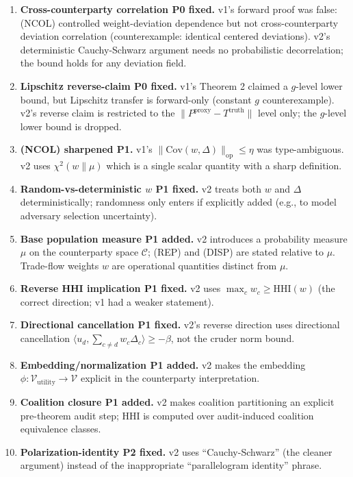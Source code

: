 \documentclass{article}
\newcommand{\HHI}{\mathrm{HHI}}
\newcommand{\Pproxy}{P^{\mathrm{proxy}}}
\newcommand{\Ttruth}{T^{\mathrm{truth}}}
\begin{document}
\begin{enumerate}
\item \textbf{Cross-counterparty correlation P0 fixed.}  v1's
  forward proof was false: (NCOL) controlled weight-deviation
  dependence but not cross-counterparty deviation correlation
  (counterexample: identical centered deviations).  v2's
  deterministic Cauchy-Schwarz argument needs no probabilistic
  decorrelation; the bound holds for any deviation field.

\item \textbf{Lipschitz reverse-claim P0 fixed.}  v1's Theorem 2
  claimed a $g$-level lower bound, but Lipschitz transfer is
  forward-only (constant $g$ counterexample).  v2's reverse claim
  is restricted to the $\|\Pproxy - \Ttruth\|$ level only; the
  $g$-level lower bound is dropped.

\item \textbf{(NCOL) sharpened P1.}  v1's $\|\mathrm{Cov}(w,
  \Delta)\|_{\mathrm{op}} \leq \eta$ was type-ambiguous.  v2 uses
  $\chi^2(w \| \mu)$ which is a single scalar quantity with a
  sharp definition.

\item \textbf{Random-vs-deterministic $w$ P1 fixed.}  v2 treats
  both $w$ and $\Delta$ deterministically; randomness only enters
  if explicitly added (e.g., to model adversary selection
  uncertainty).

\item \textbf{Base population measure P1 added.}  v2 introduces
  a probability measure $\mu$ on the counterparty space
  $\mathcal{C}$; (REP) and (DISP) are stated relative to $\mu$.
  Trade-flow weights $w$ are operational quantities distinct from
  $\mu$.

\item \textbf{Reverse HHI implication P1 fixed.}  v2 uses
  $\max_c w_c \geq \HHI(w)$ (the correct direction; v1 had a
  weaker statement).

\item \textbf{Directional cancellation P1 fixed.}  v2's reverse
  direction uses directional cancellation
  $\langle u_d, \sum_{c \neq d} w_c \Delta_c\rangle \geq -\beta$,
  not the cruder norm bound.

\item \textbf{Embedding/normalization P1 added.}  v2 makes the
  embedding $\phi: \mathcal{V}_\mathrm{utility} \to \mathcal{V}$
  explicit in the counterparty interpretation.

\item \textbf{Coalition closure P1 added.}  v2 makes coalition
  partitioning an explicit pre-theorem audit step; HHI is
  computed over audit-induced coalition equivalence classes.

\item \textbf{Polarization-identity P2 fixed.}  v2 uses
  ``Cauchy-Schwarz'' (the cleaner argument) instead of the
  inappropriate ``parallelogram identity'' phrase.
\end{enumerate}
\end{document}
